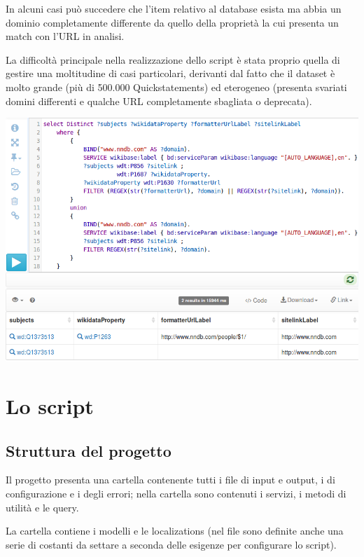In alcuni casi può succedere che l'item relativo al database esista ma abbia un dominio completamente differente da quello della proprietà la cui 
presenta un match con l'URL in analisi. 

La difficoltà principale nella realizzazione dello script è stata proprio quella di gestire una moltitudine di casi particolari, derivanti dal fatto che il dataset è molto grande
(più di 500.000 Quickstatements) ed eterogeneo (presenta svariati domini differenti e qualche URL completamente sbagliata o deprecata). 

\begin{center}
    \includegraphics[width=\linewidth]{Sources/Img/c04_01.png}
\end{center}

\section{Lo script}

\subsection{Struttura del progetto}
Il progetto presenta una cartella  contenente tutti i file di input e output, i  di configurazione e i  degli errori; 
nella cartella  sono contenuti i servizi, i metodi di utilità e le query. 

La cartella  contiene i modelli e le localizations (nel file  sono definite anche una serie di costanti da settare a seconda 
delle esigenze per configurare lo script). 

